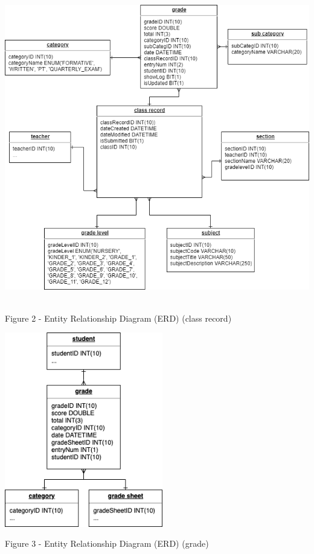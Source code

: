 \documentclass[11pt,a4paper,titlepage]{article}
\begin{document}
\vspace{1cm}
\begin{center}
    \includegraphics[height=13.5cm]{Class-Record.png}
\end{center}
\vspace{1cm}
\begin{center}
    Figure 2 - Entity Relationship Diagram (ERD) (class record)
\end{center}

\vspace{1cm}
\begin{center}
    \includegraphics[height=8.5cm]{Grade.png}
\end{center}
\vspace{1cm}
\begin{center}
    Figure 3 - Entity Relationship Diagram (ERD) (grade)
\end{center}
\end{document}
